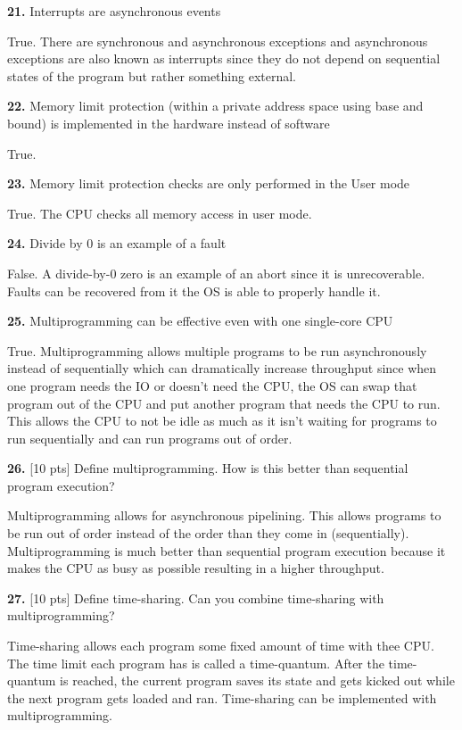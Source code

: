 \documentclass[12pt]{article}
\begin{document}
\bigskip

{\bf 21.} Interrupts are asynchronous events

True. There are synchronous and asynchronous exceptions and asynchronous exceptions are also known as interrupts since they do not depend on sequential states of the program but rather something external. 

\bigskip

{\bf 22.} Memory limit protection (within a private address space using base and bound) is
implemented in the hardware instead of software

True. 

\bigskip

{\bf 23.} Memory limit protection checks are only performed in the User mode

True. The CPU checks all memory access in user mode. 

\bigskip

{\bf 24.} Divide by 0 is an example of a fault

False. A divide-by-0 zero is an example of an abort since it is unrecoverable. Faults can be recovered from it the OS is able to properly handle it. 

\bigskip

{\bf 25.} Multiprogramming can be effective even with one single-core CPU

True. Multiprogramming allows multiple programs to be run asynchronously instead of sequentially which can dramatically increase throughput since when one program needs the IO or doesn't need the CPU, the OS can swap that program out of the CPU and put another program that needs the CPU to run. This allows the CPU to not be idle as much as it isn't waiting for programs to run sequentially and can run programs out of order. 

\bigskip

{\bf 26.} [10 pts] Define multiprogramming. How is this better than sequential program execution?

Multiprogramming allows for asynchronous pipelining. This allows programs to be run out of order instead of the order than they come in (sequentially). Multiprogramming is much better than sequential program execution because it makes the CPU as busy as possible resulting in a higher throughput. 

\bigskip

{\bf 27.} [10 pts] Define time-sharing. Can you combine time-sharing with multiprogramming?

Time-sharing allows each program some fixed amount of time with thee CPU. The time limit each program has is called a time-quantum. After the time-quantum is reached, the current program saves its state and gets kicked out while the next program gets loaded and ran. Time-sharing can be implemented with multiprogramming. 
\end{document}
